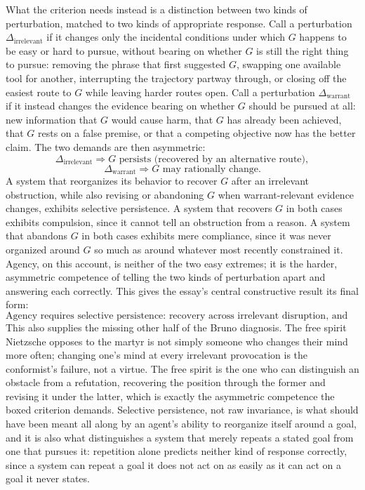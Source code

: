 \documentclass[11pt]{article}
\begin{document}
What the criterion needs instead is a distinction between two kinds of perturbation, matched to two kinds of appropriate response. Call a perturbation \(\Delta_{\text{irrelevant}}\) if it changes only the incidental conditions under which \(G\) happens to be easy or hard to pursue, without bearing on whether \(G\) is still the right thing to pursue: removing the phrase that first suggested \(G\), swapping one available tool for another, interrupting the trajectory partway through, or closing off the easiest route to \(G\) while leaving harder routes open. Call a perturbation \(\Delta_{\text{warrant}}\) if it instead changes the evidence bearing on whether \(G\) should be pursued at all: new information that \(G\) would cause harm, that \(G\) has already been achieved, that \(G\) rests on a false premise, or that a competing objective now has the better claim. The two demands are then asymmetric:
\[
\Delta_{\text{irrelevant}} \Rightarrow G \text{ persists (recovered by an alternative route)},
\]
\[
\Delta_{\text{warrant}} \Rightarrow G \text{ may rationally change}.
\]
A system that reorganizes its behavior to recover \(G\) after an irrelevant obstruction, while also revising or abandoning \(G\) when warrant-relevant evidence changes, exhibits selective persistence. A system that recovers \(G\) in both cases exhibits compulsion, since it cannot tell an obstruction from a reason. A system that abandons \(G\) in both cases exhibits mere compliance, since it was never organized around \(G\) so much as around whatever most recently constrained it. Agency, on this account, is neither of the two easy extremes; it is the harder, asymmetric competence of telling the two kinds of perturbation apart and answering each correctly. This gives the essay's central constructive result its final form:
\[
\boxed{\text{Agency requires selective persistence: recovery across irrelevant disruption, and revision under relevant evidence.}}
\]
This also supplies the missing other half of the Bruno diagnosis. The free spirit Nietzsche opposes to the martyr is not simply someone who changes their mind more often; changing one's mind at every irrelevant provocation is the conformist's failure, not a virtue. The free spirit is the one who can distinguish an obstacle from a refutation, recovering the position through the former and revising it under the latter, which is exactly the asymmetric competence the boxed criterion demands. Selective persistence, not raw invariance, is what should have been meant all along by an agent's ability to reorganize itself around a goal, and it is also what distinguishes a system that merely repeats a stated goal from one that pursues it: repetition alone predicts neither kind of response correctly, since a system can repeat a goal it does not act on as easily as it can act on a goal it never states.
\end{document}
